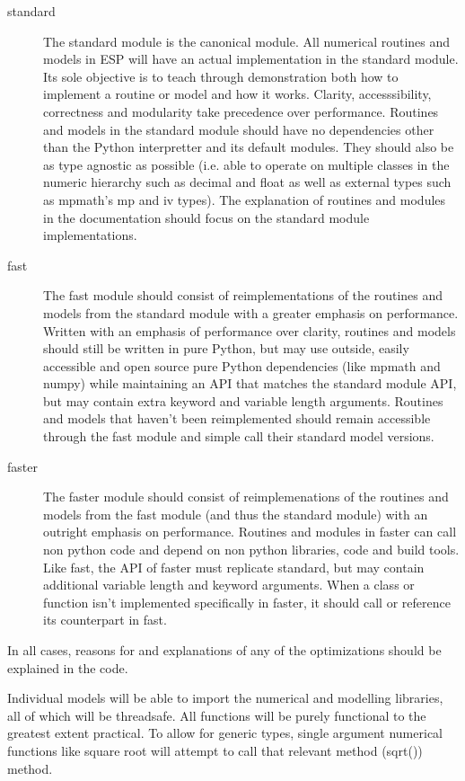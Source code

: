 \documentclass{book}
\begin{document}
\begin{description}
	\item[standard] The standard module is the canonical module. All numerical routines and models in ESP will have an actual implementation in the standard module. Its sole objective is to teach through demonstration both how to implement a routine or model and how it works. Clarity, accesssibility, correctness and modularity take precedence over performance. Routines and models in the standard module should have no dependencies other than the Python interpretter and its default modules.  They should also be as type agnostic as possible (i.e. able to operate on multiple classes in the numeric hierarchy such as decimal and float as well as external types such as mpmath's mp and iv types). The explanation of routines and modules in the documentation should focus on the standard module implementations.
	\item[fast] The fast module should consist of reimplementations of the routines and models from the standard module with a greater emphasis on performance. Written with an emphasis of performance over clarity, routines and models should still be written in pure Python, but may use outside, easily accessible and open source pure Python dependencies (like mpmath and numpy) while maintaining an API that matches the standard module API, but may contain extra keyword and variable length arguments. Routines and models that haven't been reimplemented should remain accessible through the fast module and simple call their standard model versions. 
	\item[faster] The faster module should consist of reimplemenations of the routines and models from the fast module (and thus the standard module) with an outright emphasis on performance. Routines and modules in faster can call non python code and depend on non python libraries, code and build tools. Like fast, the API of faster must replicate standard, but may contain additional variable length and keyword arguments. When a class or function isn't implemented specifically in faster, it should call or reference its counterpart in fast.
\end{description}
In all cases, reasons for and explanations of any of the optimizations should be explained in the code.

Individual models will be able to import the numerical and modelling libraries, all of which will be threadsafe. All functions will be purely functional to the greatest extent practical. To allow for generic types, single argument numerical functions like square root will attempt to call that relevant method (sqrt()) method.
\end{document}
